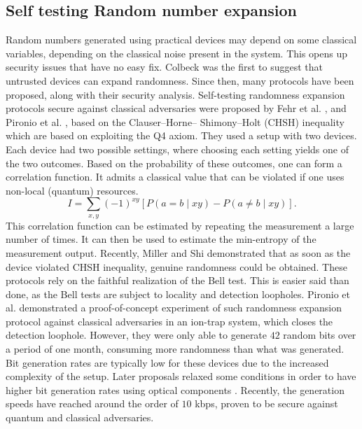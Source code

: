 \documentclass[]{interact}
\theoremstyle{plain}%
\theoremstyle{definition}
\theoremstyle{remark}
\begin{document}
\subsection{Self testing Random number expansion} Random numbers generated using practical devices may depend on some classical variables, depending on the classical noise present in the system. This opens up security issues that have no easy fix.
Colbeck \cite{Colbeck_2011} was the first to suggest that untrusted devices can expand randomness. Since then, many protocols have been proposed, along with their security analysis. Self-testing randomness expansion protocols secure against
classical adversaries were proposed by Fehr et al. \cite{PhysRevA.87.012335}, and Pironio et al. \cite{Pironio_2013}, based on the Clauser–Horne–
Shimony–Holt (CHSH) inequality \cite{clauser1969proposed} which are based on exploiting the Q4 axiom. They used a setup with two devices. Each device had two possible settings, where choosing each setting yields one of the two outcomes. Based on the probability of these outcomes, one can form a correlation function. It admits a classical value that can be violated if one uses non-local (quantum) resources.
$$
    I=\sum_{x, y}(-1)^{x y}[P(a=b \mid x y)-P(a \neq b \mid x y)].
$$
This correlation function can be estimated by repeating the measurement a large number of times. It can then be used to estimate the min-entropy of the measurement output. Recently, Miller and Shi \cite{miller2015universal} demonstrated that as soon as the device violated CHSH inequality,  genuine randomness could be obtained. These protocols rely on the faithful realization of the Bell test. This is easier said than done, as the Bell tests are subject to locality and detection loopholes. Pironio et al. demonstrated
a proof-of-concept experiment of such randomness expansion protocol against classical adversaries \cite{Pironio_2010} in  an ion-trap system, which closes the detection loophole. However, they were only able to generate $42$ random bits over a period of one month, consuming more randomness than what was generated. Bit generation rates are typically low for these devices due to the increased complexity of the setup. Later proposals relaxed some conditions in order to have higher bit generation rates using optical components \cite{giustina2013bell}. Recently, the generation speeds have reached around the order of $10$ kbps, proven to be secure against quantum \cite{Liu2021,PhysRevLett.126.050503} and classical \cite{Shalm2021} adversaries.
\end{document}
